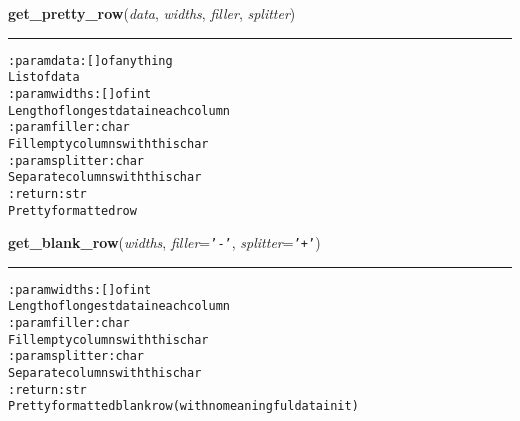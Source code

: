     \label{hal:streams:pretty_table:get_pretty_row}

    \vspace{0.5ex}

\hspace{.8\funcindent}\begin{boxedminipage}{\funcwidth}

    \raggedright \textbf{get\_pretty\_row}(\textit{data}, \textit{widths}, \textit{filler}, \textit{splitter})

    \vspace{-1.5ex}

    \rule{\textwidth}{0.5\fboxrule}
\setlength{\parskip}{2ex}
\begin{alltt}

:param data: [] of anything
    List of data
:param widths: [] of int
    Length of longest data in each column
:param filler: char
    Fill empty columns with this char
:param splitter: char
    Separate columns with this char
:return: str
    Pretty formatted row
\end{alltt}

\setlength{\parskip}{1ex}
    \end{boxedminipage}

    \label{hal:streams:pretty_table:get_blank_row}

    \vspace{0.5ex}

\hspace{.8\funcindent}\begin{boxedminipage}{\funcwidth}

    \raggedright \textbf{get\_blank\_row}(\textit{widths}, \textit{filler}={\tt \texttt{'}\texttt{-}\texttt{'}}, \textit{splitter}={\tt \texttt{'}\texttt{+}\texttt{'}})

    \vspace{-1.5ex}

    \rule{\textwidth}{0.5\fboxrule}
\setlength{\parskip}{2ex}
\begin{alltt}

:param widths: [] of int
    Length of longest data in each column
:param filler: char
    Fill empty columns with this char
:param splitter: char
    Separate columns with this char
:return: str
    Pretty formatted blank row (with no meaningful data in it)
\end{alltt}

\setlength{\parskip}{1ex}
    \end{boxedminipage}

